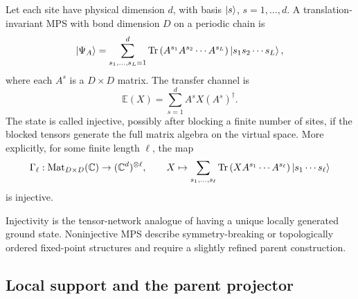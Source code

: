 Let each site have physical dimension \(d\), with basis
\(\left|s\right\rangle\), \(s=1,\ldots,d\).  A translation-invariant MPS with bond dimension
\(D\) on a periodic chain is
\begin{equation}
\label{eq:mps-periodic-definition}
    \left|\Psi_A\right\rangle
    =
    \sum_{s_1,\ldots,s_L=1}^{d}
    \operatorname{Tr}\left(A^{s_1}A^{s_2}\cdots A^{s_L}\right)
    \left|s_1s_2\cdots s_L\right\rangle,
\end{equation}
where each \(A^s\) is a \(D\times D\) matrix.  The transfer channel is
\begin{equation}
\label{eq:mps-transfer-channel-general}
    \mathbb{E}(X)
    =
    \sum_{s=1}^{d}A^sX(A^s)^\dagger .
\end{equation}
The state is called injective, possibly after blocking a finite number of sites,
if the blocked tensors generate the full matrix algebra on the virtual space.
More explicitly, for some finite length \(\ell\), the map
\begin{equation}
\label{eq:mps-injectivity-map}
    \Gamma_\ell:
    \operatorname{Mat}_{D\times D}(\mathbb{C})
    \to
    (\mathbb{C}^d)^{\otimes \ell},
    \qquad
    X
    \mapsto
    \sum_{s_1,\ldots,s_\ell}
    \operatorname{Tr}\left(XA^{s_1}\cdots A^{s_\ell}\right)
    \left|s_1\cdots s_\ell\right\rangle
\end{equation}
is injective.

Injectivity is the tensor-network analogue of having a unique locally generated
ground state.  Noninjective MPS describe symmetry-breaking or topologically
ordered fixed-point structures and require a slightly refined parent
construction.

\subsection{Local support and the parent projector}
\label{subsec:mps-parent-projector}

